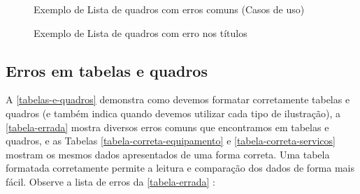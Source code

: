 \begin{figure}[htb]
    \centering
	\caption{\label{fig_erros_lista_quadros}Exemplo de Lista de quadros com erros comuns (Casos de uso)}
\end{figure}

\begin{figure}[htb]
    \centering
	\caption{\label{fig_erros_lista_quadros_2}Exemplo de Lista de quadros com erro nos títulos}
\end{figure}



\subsection{Erros em tabelas e quadros}
\label{sub-erros-tabelas}
A \autoref{tabelas-e-quadros} demonstra como devemos formatar corretamente tabelas e quadros (e também indica quando devemos utilizar cada tipo de ilustração), a \autoref{tabela-errada} mostra diversos erros comuns que encontramos em tabelas e quadros, e as Tabelas \ref{tabela-correta-equipamento} e \ref{tabela-correta-servicos} mostram os mesmos dados apresentados de uma forma correta. Uma tabela formatada corretamente permite a leitura e comparação dos dados de forma mais fácil. Observe a lista de erros da \autoref{tabela-errada} :


